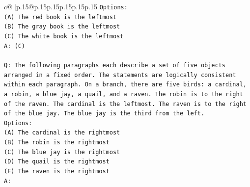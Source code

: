 \documentclass{article}
\begin{document}
{\begin{supertabular}{c@{$\;$}|p{.15\linewidth}@{}p{.15\linewidth}p{.15\linewidth}p{.15\linewidth}p{.15\linewidth}p{.15\linewidth}}
{{{\texttt{Options:} \\
\texttt{(A) The red book is the leftmost} \\
\texttt{(B) The gray book is the leftmost} \\
\texttt{(C) The white book is the leftmost} \\
\texttt{A: (C)} \\
\\ 
\texttt{Q: The following paragraphs each describe a set of five objects arranged in a fixed order. The statements are logically consistent within each paragraph. On a branch, there are five birds: a cardinal, a robin, a blue jay, a quail, and a raven. The robin is to the right of the raven. The cardinal is the leftmost. The raven is to the right of the blue jay. The blue jay is the third from the left.} \\
\texttt{Options:} \\
\texttt{(A) The cardinal is the rightmost} \\
\texttt{(B) The robin is the rightmost} \\
\texttt{(C) The blue jay is the rightmost} \\
\texttt{(D) The quail is the rightmost} \\
\texttt{(E) The raven is the rightmost} \\
\texttt{A:} \\
            }
        }
    }
     \\ \\


\end{supertabular}}
\end{document}
